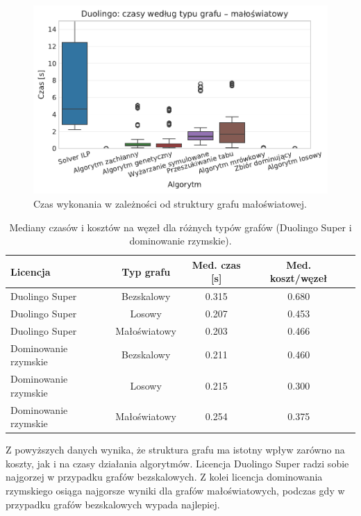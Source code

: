 \begin{figure}[H]
  \centering
  \includegraphics[width=0.65\linewidth]{assets/figures/benchmark/synthetic/duolingo_time_by_graph_small_world.pdf}
  \caption{Czas wykonania w zależności od struktury grafu małoświatowej.}
  \label{fig:duo-synth-time-small-world}
\end{figure}


\begin{table}[H]
  \centering
  \caption{Mediany czasów i kosztów na węzeł dla różnych typów grafów (Duolingo Super i dominowanie rzymskie).}
  \label{tab:duo-synth-summary-times}
  \begin{tabular}{lcccc}
    \toprule
    \textbf{Licencja}    & \textbf{Typ grafu} & \textbf{Med. czas [s]} & \textbf{Med. koszt/węzeł} \\
    \midrule
    Duolingo Super       & Bezskalowy         & 0.315                  & 0.680                     \\
    Duolingo Super       & Losowy             & 0.207                  & 0.453                     \\
    Duolingo Super       & Małoświatowy       & 0.203                  & 0.466                     \\
    Dominowanie rzymskie & Bezskalowy         & 0.211                  & 0.460                     \\
    Dominowanie rzymskie & Losowy             & 0.215                  & 0.300                     \\
    Dominowanie rzymskie & Małoświatowy       & 0.254                  & 0.375                     \\
    \bottomrule
  \end{tabular}
\end{table}

Z powyższych danych wynika, że struktura grafu ma istotny wpływ zarówno na koszty, jak i na czasy działania algorytmów. Licencja Duolingo Super radzi sobie najgorzej w przypadku grafów bezskalowych. Z kolei licencja dominowania rzymskiego osiąga najgorsze wyniki dla grafów małoświatowych, podczas gdy w przypadku grafów bezskalowych wypada najlepiej.

